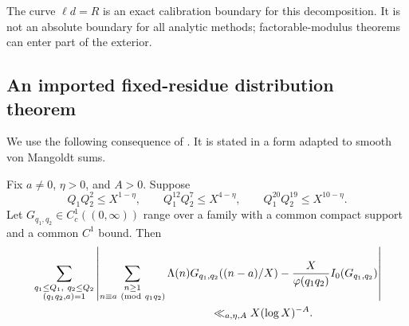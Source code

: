 The curve $\ell d=R$ is an exact calibration boundary for this
decomposition.  It is not an absolute boundary for all analytic methods;
factorable-modulus theorems can enter part of the exterior.

\subsection{An imported fixed-residue distribution theorem}

We use the following consequence of \citet[Theorem~1.1]{Maynard2025I}.
It is stated in a form adapted to smooth von Mangoldt sums.

\begin{theorem}
\label{thm:Maynard-factorable}
Fix $a\ne0$, $\eta>0$, and $A>0$.  Suppose
\begin{equation}
 Q_1Q_2^2\le X^{1-\eta},\qquad
 Q_1^{12}Q_2^7\le X^{4-\eta},\qquad
 Q_1^{20}Q_2^{19}\le X^{10-\eta}.
 \label{eq:Maynard-three-inequalities}
\end{equation}
Let $G_{q_1,q_2}\in C_c^1((0,\infty))$ range over a family with a common
compact support and a common $C^1$ bound.  Then
\begin{align}
 &\sum_{\substack{q_1\le Q_1,\ q_2\le Q_2\\(q_1q_2,a)=1}}
 \left|
 \sum_{\substack{n\ge1\\n\equiv a\ ({\rm mod}\ q_1q_2)}}
 \Lambda(n)G_{q_1,q_2}((n-a)/X)
 -\frac X{\varphi(q_1q_2)}I_0(G_{q_1,q_2})
 \right|
 \notag\\
 &\hspace{16em}\ll_{a,\eta,A}X(\log X)^{-A}.
 \label{eq:Maynard-smoothed-consequence}
 \end{align}
\end{theorem}

